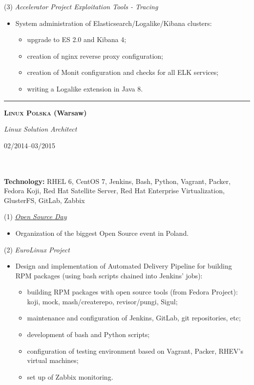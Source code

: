 \documentclass[$fontsize$, a4paper]{article}
\newcommand\textbox[1]{%
  \parbox{.333\textwidth}{#1}%
}
\begin{document}
\vspace{5pt}
(3) \emph{Accelerator Project Exploitation Tools - Tracing}
\begin{itemize}
  \item System administration of Elasticsearch/Logalike/Kibana clusters:
  \begin{itemize}
    \item upgrade to ES 2.0 and Kibana 4;
    \item creation of nginx reverse proxy configuration;
    \item creation of Monit configuration and checks for all ELK services;
    \item writing a Logalike extension in Java 8.
  \end{itemize}
\end{itemize}


\noindent\rule[0.5ex]{\linewidth}{1pt}

\noindent\textbox{\textbf{\textsc{Linux Polska} (Warsaw)}\hfill}\textbox{\hfil \emph{Linux Solution Architect}\hfil}\textbox{\hfill 02/2014--03/2015}\\\\
\textbf{Technology:} RHEL 6, CentOS 7, Jenkins, Bash, Python, Vagrant, Packer, Fedora Koji, Red Hat Satellite Server, Red Hat Enterprise Virtualization, GlusterFS, GitLab, Zabbix

\vspace{5pt}
(1) \emph{\href{http://opensourceday.com/}{Open Source Day}}
\begin{itemize}
  \item Organization of the biggest Open Source event in Poland.
\end{itemize}

(2) \emph{EuroLinux Project}
\begin{itemize}
  \item Design and implementation of Automated Delivery Pipeline for building RPM packages (using bash scripts chained into Jenkins' jobs):

  \begin{itemize}
  \item building RPM packages with open source tools (from Fedora Project):
  koji, mock, mash/createrepo, revisor/pungi, Sigul;
  \item maintenance and configuration of Jenkins, GitLab, git repositories, etc;
  \item development of bash and Python scripts;
  \item configuration of testing environment based on Vagrant, Packer, RHEV's virtual machines;
  \item set up of Zabbix monitoring.
  \end{itemize}

\end{itemize}
\end{document}
